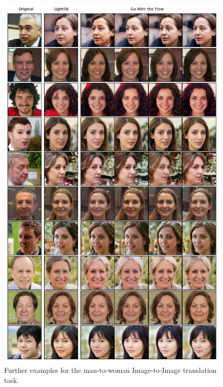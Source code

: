 \documentclass[twoside]{article}
\begin{document}
\begin{figure}[!ht]
    \centering
    \includegraphics[width=0.7 \linewidth]{figures/M2F_extended.png}
    \caption{Further examples for the man-to-woman Image-to-Image translation task.}
    \label{fig:m2f_extended}
\end{figure}
%
\end{document}
